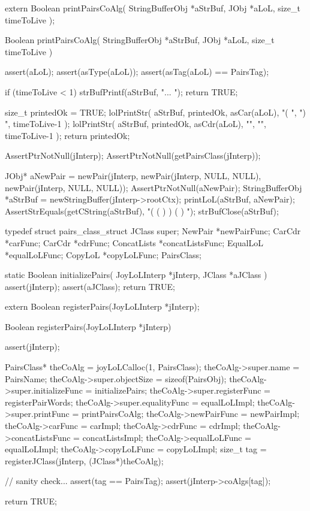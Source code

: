 \startCHeader
extern Boolean printPairsCoAlg(
  StringBufferObj *aStrBuf,
  JObj            *aLoL,
  size_t           timeToLive
);
\stopCHeader
{}

\startCCode
Boolean printPairsCoAlg(
  StringBufferObj *aStrBuf,
  JObj            *aLoL,
  size_t           timeToLive
) {
  assert(aLoL);
  assert(asType(aLoL));
  assert(asTag(aLoL) == PairsTag);

  if (timeToLive < 1) {
    strBufPrintf(aStrBuf, "... ");
    return TRUE;
  }
  
  size_t printedOk = TRUE;
  lolPrintStr(
    aStrBuf,
    printedOk,
    asCar(aLoL),
    "( ", ") ",
    timeToLive-1
  );
  lolPrintStr(
    aStrBuf,
    printedOk,
    asCdr(aLoL),
    "",   "",
    timeToLive-1
  );
  return printedOk;
}
\stopCCode


\startCTest
  AssertPtrNotNull(jInterp);
  AssertPtrNotNull(getPairsClass(jInterp));

  JObj* aNewPair = newPair(jInterp,
                               newPair(jInterp, NULL, NULL),
                               newPair(jInterp, NULL, NULL));
  AssertPtrNotNull(aNewPair);
  StringBufferObj *aStrBuf = newStringBuffer(jInterp->rootCtx);
  printLoL(aStrBuf, aNewPair);
  AssertStrEquals(getCString(aStrBuf), "( ( ) ) ( ) ");
  strBufClose(aStrBuf);
\stopCTest
\stopTestCase
\stopTestSuite

\startTestSuite[registerPairs]

\startCHeader
typedef struct pairs_class_struct {
  JClass       super;
  NewPair     *newPairFunc;
  CarCdr      *carFunc;
  CarCdr      *cdrFunc;
  ConcatLists *concatListsFunc;
  EqualLoL    *equalLoLFunc;
  CopyLoL     *copyLoLFunc;
} PairsClass;
\stopCHeader

\startCCode
static Boolean initializePairs(
  JoyLoLInterp *jInterp,
  JClass   *aJClass
) {
  assert(jInterp);
  assert(aJClass);
  return TRUE;
}
\stopCCode

\startCHeader
extern Boolean registerPairs(JoyLoLInterp *jInterp);
\stopCHeader
{}

\startCCode
Boolean registerPairs(JoyLoLInterp *jInterp) {
  assert(jInterp);
  
  PairsClass* theCoAlg           = joyLoLCalloc(1, PairsClass);
  theCoAlg->super.name           = PairsName;
  theCoAlg->super.objectSize     = sizeof(PairsObj);
  theCoAlg->super.initializeFunc = initializePairs;
  theCoAlg->super.registerFunc   = registerPairWords;
  theCoAlg->super.equalityFunc   = equalLoLImpl;
  theCoAlg->super.printFunc      = printPairsCoAlg;
  theCoAlg->newPairFunc          = newPairImpl;
  theCoAlg->carFunc              = carImpl;
  theCoAlg->cdrFunc              = cdrImpl;
  theCoAlg->concatListsFunc      = concatListsImpl;
  theCoAlg->equalLoLFunc         = equalLoLImpl;
  theCoAlg->copyLoLFunc          = copyLoLImpl;
  size_t tag =
    registerJClass(jInterp, (JClass*)theCoAlg);
  
  // sanity check...
  assert(tag == PairsTag);
  assert(jInterp->coAlgs[tag]);

  return TRUE;
}
\stopCCode

